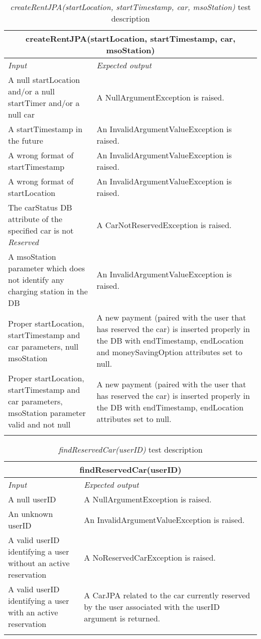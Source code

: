 \begin{longtable}{p{0.35\linewidth}p{0.65\linewidth}}
\multicolumn{2}{c}{\textbf{createRentJPA(startLocation, startTimestamp, car, msoStation)}} \\
\toprule
\emph{Input} & \emph{Expected output} \\
\midrule
A null startLocation and/or a null startTimer and/or a null car & A NullArgumentException is raised.\\
\midrule
A startTimestamp in the future & An InvalidArgumentValueException is raised. \\
\midrule
A wrong format of startTimestamp & An InvalidArgumentValueException is raised. \\
\midrule
A wrong format of startLocation & An InvalidArgumentValueException is raised. \\
\midrule
The carStatus DB attribute of the specified car is not \emph{Reserved} & A CarNotReservedException is raised. \\
\midrule
A msoStation parameter which does not identify any charging station in the DB & An InvalidArgumentValueException is raised. \\
\midrule
Proper startLocation, startTimestamp and car parameters, null msoStation & A new payment (paired with the user that has reserved the car) is inserted properly in the DB with endTimestamp, endLocation and moneySavingOption attributes set to null.\\
\midrule
Proper \mbox{startLocation}, startTimestamp and car parameters, \mbox{msoStation} parameter valid and not null & A new payment (paired with the user that has reserved the car) is inserted properly in the DB with endTimestamp, endLocation attributes set to null.\\
\bottomrule
\caption{\emph{createRentJPA(startLocation, startTimestamp, car, msoStation)} test description}
\end{longtable}

\begin{longtable}{p{0.3\linewidth}p{0.7\linewidth}}
\multicolumn{2}{c}{\textbf{findReservedCar(userID)}} \\
\toprule
\emph{Input} & \emph{Expected output} \\
\midrule
A null userID & A NullArgumentException is raised.\\
\midrule
An unknown userID  & An InvalidArgumentValueException is raised. \\
\midrule
A valid userID identifying a user without an active reservation & A NoReservedCarException is raised. \\
\midrule
A valid userID identifying a user with an active reservation & A CarJPA related to the car currently reserved by the user associated with the userID argument is returned.\\
\bottomrule
\caption{\emph{findReservedCar(userID)} test description}
\end{longtable}

